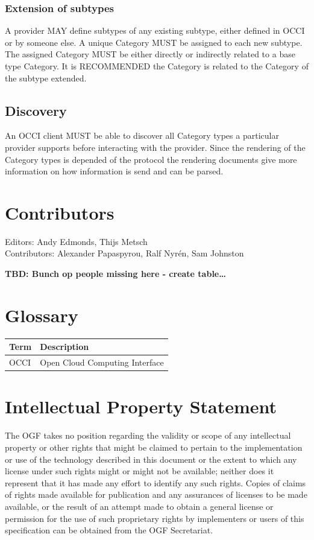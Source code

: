 \documentclass[10pt,a4paper]{article}
\begin{document}
\subsubsection{Extension of subtypes}
A provider MAY define subtypes of any existing subtype, either defined in OCCI or by someone else. A unique Category MUST be assigned to each new subtype. The assigned Category MUST be either directly or indirectly related to a base type Category. It is RECOMMENDED the Category is related to the Category of the subtype extended.

\subsection{Discovery}
An OCCI client MUST be able to discover all Category types a particular provider supports before interacting with the provider. Since the rendering of the Category types is depended of the protocol the rendering documents give more information on how information is send and can be parsed.

\section{Contributors}
Editors: Andy Edmonds, Thijs Metsch \\
Contributors: Alexander Papaspyrou, Ralf Nyrén, Sam Johnston

\textbf{TBD: Bunch op people missing here - create table\ldots}

\section{Glossary}

\begin{tabular}{l|l}
Term & Description \\
\hline
OCCI & Open Cloud Computing Interface \\
\end{tabular}

\section{Intellectual Property Statement}

The OGF takes no position regarding the validity or scope of any intellectual property or other rights that might be claimed to pertain to the implementation or use of the technology described in this document or the extent to which any license under such rights might or might not be available; neither does it represent that it has made any effort to identify any such rights. Copies of claims of rights made available for publication and any assurances of licenses to be made available, or the result of an attempt made to obtain a general license or permission for the use of such proprietary rights by implementers or users of this specification can be obtained from the OGF Secretariat.
\end{document}
